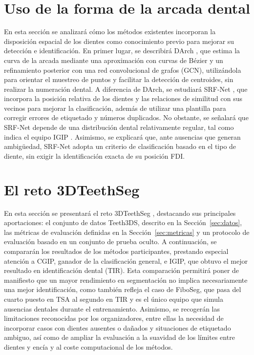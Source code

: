 \section{Uso de la forma de la arcada dental}
\label{sec:ea-arcada}

En esta sección se analizará cómo los métodos existentes incorporan la disposición espacial de los dientes como conocimiento previo para mejorar su detección e identificación. En primer lugar, se describirá DArch \cite{qiuDArchDentalArch2022}, que estima la curva de la arcada mediante una aproximación con curvas de Bézier y un refinamiento posterior con una red convolucional de grafos (GCN), utilizándola para orientar el muestreo de puntos y facilitar la detección de centroides, sin realizar la numeración dental. A diferencia de DArch, se estudiará SRF-Net \cite{maSRFNetSpatialRelationship2020}, que incorpora la posición relativa de los dientes y las relaciones de similitud con sus vecinos para mejorar la clasificación, además de utilizar una plantilla para corregir errores de etiquetado y números duplicados. No obstante, se señalará que SRF-Net depende de una distribución dental relativamente regular, tal como indica el equipo IGIP \cite{ben-hamadou3DTeethSeg223DTeeth2023}. Asimismo, se explicará que, ante ausencias que generan ambigüedad, SRF-Net adopta un criterio de clasificación basado en el tipo de diente, sin exigir la identificación exacta de su posición FDI.

\section{El reto 3DTeethSeg}
\label{sec:ea-reto}

En esta sección se presentará el reto 3DTeethSeg \cite{ben-hamadou3DTeethSeg223DTeeth2023}, destacando sus principales aportaciones: el conjunto de datos Teeth3DS, descrito en la Sección~\ref{sec:datos}, las métricas de evaluación definidas en la Sección~\ref{sec:metricas} y un protocolo de evaluación basado en un conjunto de prueba oculto. A continuación, se compararán los resultados de los métodos participantes, prestando especial atención a CGIP, ganador de la clasificación general, e IGIP, que obtuvo el mejor resultado en identificación dental (TIR). Esta comparación permitirá poner de manifiesto que un mayor rendimiento en segmentación no implica necesariamente una mejor identificación, como también refleja el caso de FiboSeg, que pasa del cuarto puesto en TSA al segundo en TIR y es el único equipo que simula ausencias dentales durante el entrenamiento. Asimismo, se recogerán las limitaciones reconocidas por los organizadores, entre ellas la necesidad de incorporar casos con dientes ausentes o dañados y situaciones de etiquetado ambiguo, así como de ampliar la evaluación a la suavidad de los límites entre dientes y encía y al coste computacional de los métodos.

